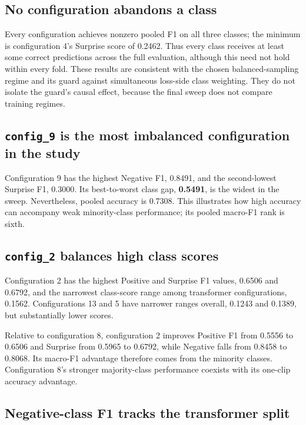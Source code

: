 \subsection{No configuration abandons a class}
\label{sec:no-abandoned-class}

Every configuration achieves nonzero pooled F1 on all three classes; the minimum is configuration 4's Surprise score of 0.2462. Thus every class receives at least some correct predictions across the full evaluation, although this need not hold within every fold. These results are consistent with the chosen balanced-sampling regime and its guard against simultaneous loss-side class weighting. They do not isolate the guard's causal effect, because the final sweep does not compare training regimes.

\subsection{\texttt{config\_9} is the most imbalanced configuration in the study}
\label{sec:config9-imbalanced}

Configuration 9 has the highest Negative F1, 0.8491, and the second-lowest Surprise F1, 0.3000. Its best-to-worst class gap, \textbf{0.5491}, is the widest in the sweep. Nevertheless, pooled accuracy is 0.7308. This illustrates how high accuracy can accompany weak minority-class performance; its pooled macro-F1 rank is sixth.

\subsection{\texttt{config\_2} balances high class scores}
\label{sec:config2-balanced}

Configuration 2 has the highest Positive and Surprise F1 values, 0.6506 and 0.6792, and the narrowest class-score range among transformer configurations, 0.1562. Configurations 13 and 5 have narrower ranges overall, 0.1243 and 0.1389, but substantially lower scores.

Relative to configuration 8, configuration 2 improves Positive F1 from 0.5556 to 0.6506 and Surprise from 0.5965 to 0.6792, while Negative falls from 0.8458 to 0.8068. Its macro-F1 advantage therefore comes from the minority classes. Configuration 8's stronger majority-class performance coexists with its one-clip accuracy advantage.

\subsection{Negative-class F1 tracks the transformer split}
\label{sec:negative-tracks-split}

